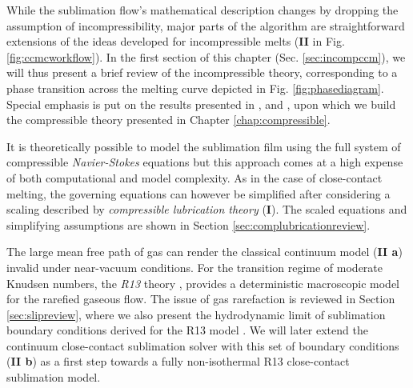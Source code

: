 While the sublimation flow's mathematical description changes by dropping the assumption of incompressibility, major parts of the algorithm are straightforward extensions of the ideas developed for incompressible melts (\textbf{II} in Fig. \ref{fig:ccmcworkflow}).
In the first section of this chapter (Sec. \ref{sec:incompccm}), we will thus present a brief review of the incompressible theory, corresponding to a phase transition across the melting curve depicted in Fig. \ref{fig:phasediagram}. Special emphasis is put on the results presented in \cite{schuller2017spatially}, \cite{schuller2019icarus} and \cite{schuller2016curvilinearccm}, upon which we build the compressible theory presented in Chapter \ref{chap:compressible}.

It is theoretically possible to model the sublimation film using the full system of compressible \textit{Navier-Stokes} equations but this approach comes at a high expense of both computational and model complexity. As in the case of close-contact melting, the governing equations can however be simplified after considering a scaling described by \textit{compressible lubrication theory} (\textbf{I}). The scaled equations and simplifying assumptions are shown in Section \ref{sec:complubricationreview}.

The large mean free path of gas can render the classical continuum model (\textbf{II a}) invalid under near-vacuum conditions.  For the transition regime of moderate Knudsen numbers, the \textit{R13} theory \cite{struchtrup2003r13derivation}, \cite{struchtrup2005macroscopic} provides a deterministic macroscopic model for the rarefied gaseous flow. The issue of gas rarefaction is reviewed in Section \ref{sec:slipreview}, where we also present the hydrodynamic limit of sublimation boundary conditions derived for the R13 model \cite{beckmann2018evaporation}. We will later extend the continuum close-contact sublimation solver with this set of boundary conditions (\textbf{II b}) as a first step towards a fully non-isothermal R13 close-contact sublimation model.

\FloatBarrier








\newpage
